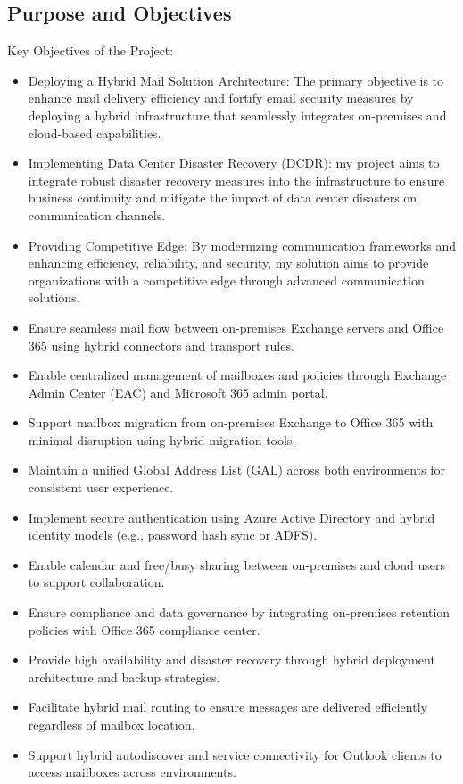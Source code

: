 \subsection{Purpose and Objectives}
Key Objectives of the Project:
\begin{itemize}
    \item Deploying a Hybrid Mail Solution Architecture: The primary objective is to enhance mail delivery efficiency and fortify email security measures by deploying a hybrid infrastructure that seamlessly integrates on-premises and cloud-based capabilities.
    \item Implementing Data Center Disaster Recovery (DCDR): my project aims to integrate robust disaster recovery measures into the infrastructure to ensure business continuity and mitigate the impact of data center disasters on communication channels.
    \item Providing Competitive Edge: By modernizing communication frameworks and enhancing efficiency, reliability, and security, my solution aims to provide organizations with a competitive edge through advanced communication solutions.
    \item Ensure seamless mail flow between on-premises Exchange servers and Office 365 using hybrid connectors and transport rules.
    \item Enable centralized management of mailboxes and policies through Exchange Admin Center (EAC) and Microsoft 365 admin portal.
    \item Support mailbox migration from on-premises Exchange to Office 365 with minimal disruption using hybrid migration tools.
    \item Maintain a unified Global Address List (GAL) across both environments for consistent user experience.
    \item Implement secure authentication using Azure Active Directory and hybrid identity models (e.g., password hash sync or ADFS).
    \item Enable calendar and free/busy sharing between on-premises and cloud users to support collaboration.
    \item Ensure compliance and data governance by integrating on-premises retention policies with Office 365 compliance center.
    \item Provide high availability and disaster recovery through hybrid deployment architecture and backup strategies.
    \item Facilitate hybrid mail routing to ensure messages are delivered efficiently regardless of mailbox location.
    \item Support hybrid autodiscover and service connectivity for Outlook clients to access mailboxes across environments.
\end{itemize}


